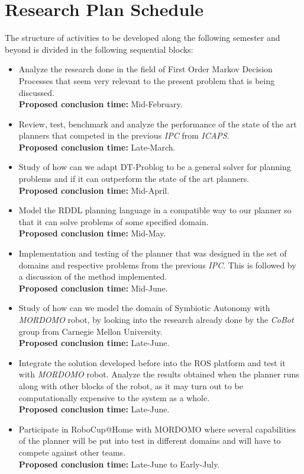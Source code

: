 
\chapter{Research Plan Schedule}

The structure of activities to be developed along the following semester and
beyond is divided in the following sequential blocks:
\begin{itemize}
    \item Analyze the research done in the field of First Order Markov Decision
    Processes that seem very relevant to the present problem that is being
    discussed.\\
    \textbf{Proposed conclusion time: } Mid-February.
    \item Review, test, benchmark and analyze the performance of the state of
    the art planners that competed in the previous \textit{IPC} from
    \textit{ICAPS}. \\
    \textbf{Proposed conclusion time: } Late-March.
    \item Study of how can we adapt DT-Problog to be a general solver for
    planning problems and if it can outperform the state of the art planners.\\
    \textbf{Proposed conclusion time: } Mid-April.
    \item Model the RDDL planning language in a compatible way to our planner so
    that it can solve problems of some specified domain.\\
    \textbf{Proposed conclusion time: } Mid-May.
    \item Implementation and testing of the planner that was designed in
    the set of domains and respective problems from the previous \textit{IPC}.
    This is followed by a discussion of the method implemented.\\
    \textbf{Proposed conclusion time: } Mid-June.
    \item Study of how can we model the domain of Symbiotic Autonomy with
    \textit{MORDOMO} robot, by looking into the research already done by the
    \textit{CoBot} group from Carnegie Mellon University.\\
    \textbf{Proposed conclusion time: } Late-June.
    \item Integrate the solution developed before into the ROS platform and test
    it with \textit{MORDOMO} robot. Analyze the results obtained when the
    planner runs along with other blocks of the robot, as it may turn out to be
    computationally expensive to the system as a whole.\\
    \textbf{Proposed conclusion time: } Late-June.
    \item Participate in RoboCup@Home with MORDOMO where several capabilities of
    the planner will be put into test in different domains and will have to
    compete against other teams.\\
    \textbf{Proposed conclusion time: } Late-June to Early-July.
\end{itemize}

